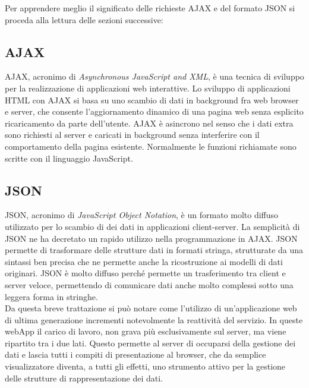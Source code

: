 \newpage

Per apprendere meglio il significato  delle richieste AJAX e del formato JSON si proceda alla lettura delle sezioni successive:

\subsection{AJAX} %
\label{sub:ajax}
AJAX, acronimo di {\itshape Asynchronous JavaScript and XML}, è una tecnica di sviluppo per la realizzazione di applicazioni web interattive. Lo sviluppo di applicazioni HTML con AJAX si basa su uno scambio di dati in background fra web browser e server, che consente l'aggiornamento dinamico di una pagina web senza esplicito ricaricamento da parte dell'utente. AJAX è asincrono nel senso che i dati extra sono richiesti al server e caricati in background senza interferire con il comportamento della pagina esistente. Normalmente le funzioni richiamate sono scritte con il linguaggio JavaScript.

\subsection{JSON} %
\label{sub:json}
JSON, acronimo di {\itshape JavaScript Object Notation}, è un formato molto diffuso utilizzato per lo scambio di dei dati in applicazioni client-server. La semplicità di JSON ne ha decretato un rapido utilizzo nella programmazione in AJAX. JSON permette di trasformare delle strutture dati in formati stringa, strutturate da una sintassi ben precisa che ne permette anche la ricostruzione ai modelli di dati originari. JSON è molto diffuso perché permette un trasferimento tra client e server veloce, permettendo di comunicare dati anche molto complessi sotto una leggera forma in stringhe.\\

Da questa breve trattazione si può notare come l’utilizzo di un’applicazione web di ultima generazione incrementi notevolmente la reattività del servizio. In queste webApp il carico di lavoro, non grava più esclusivamente sul server, ma viene ripartito tra i due lati. Questo permette al server di occuparsi della gestione dei dati e lascia tutti i compiti di presentazione al browser, che da semplice visualizzatore diventa, a tutti gli effetti, uno strumento attivo per la gestione delle strutture di rappresentazione dei dati.

\newpage

